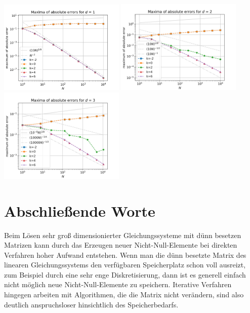 \documentclass{scrartcl}
\begin{document}
{
  \centering
    \includegraphics[width=0.45\textwidth]{Grafiken/epsilon_d1}
    \includegraphics[width=0.45\textwidth]{Grafiken/epsilon_d2}
    \includegraphics[width=0.45\textwidth]{Grafiken/epsilon_d3}
    \vspace{-0.2cm}
}
\vspace{0.5cm}


\pagebreak
\section{Abschließende Worte}
Beim Lösen sehr groß dimensionierter Gleichungssysteme mit dünn besetzen Matrizen kann durch das Erzeugen neuer Nicht-Null-Elemente bei direkten Verfahren hoher Aufwand entstehen.
Wenn man die dünn besetzte Matrix des linearen Gleichungssystems den verfügbaren Speicherplatz schon voll ausreizt, zum Beispiel durch eine sehr enge Diskretisierung, dann ist es generell einfach nicht möglich neue Nicht-Null-Elemente zu speichern.
Iterative Verfahren hingegen arbeiten mit Algorithmen, die die Matrix nicht verändern, sind also deutlich anspruchsloser hinsichtlich des Speicherbedarfs.
\end{document}
